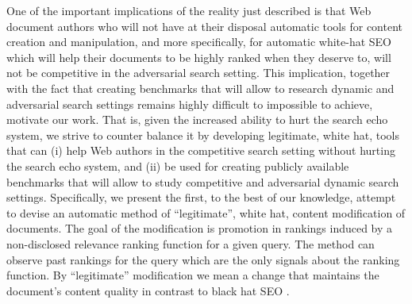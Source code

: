 

One of the important implications of the reality just described is that Web document authors who will
not have at their disposal automatic tools for content creation and
manipulation, and more specifically, for automatic white-hat SEO which
will help their documents to be highly ranked when they deserve to,
will not be competitive in the adversarial search setting. This implication, together with the fact
that creating benchmarks that will allow
to research dynamic and adversarial search settings remains
highly difficult to impossible to achieve, motivate our work.
That is, given the increased ability to hurt the search echo
system, we strive to counter balance it by developing legitimate, white hat, tools that can (i) help Web authors in the competitive search setting
without hurting the search echo system, and (ii) be used for creating
publicly available benchmarks that will allow to study competitive and
adversarial dynamic search settings.
Specifically, we present the first, to the best of our knowledge,
attempt to devise an automatic method of ``legitimate'', white hat, content modification of documents. The goal of the modification is promotion in rankings
induced by a non-disclosed relevance ranking function for a given
query. The method can observe past rankings for the query
which are the only signals about the ranking function. By
``legitimate'' modification we mean a change that maintains the
document's content quality in contrast to black hat SEO
\cite{Gyongyi+Molina:05a}. 

